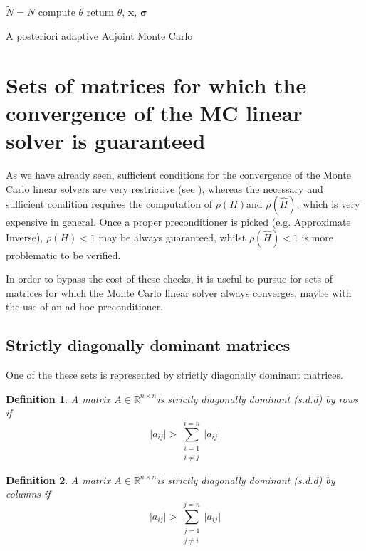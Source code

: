 \documentclass[a4paper,10pt]{article}
\newtheorem{defn}{Definition}
\begin{document}
\begin{algorithm}[H]
 $\tilde{N}=N$\;
 compute $\theta$\;
 return $\theta$, $\mathbf{x}$, $\boldsymbol{\sigma}$\; 
 \caption{A posteriori adaptive Adjoint Monte Carlo}
\end{algorithm}

\section{Sets of matrices for which the convergence of the MC linear solver is 
guaranteed}

As we have already seen, sufficient conditions for 
the convergence of the Monte Carlo linear solvers are very restrictive (see 
\cite{MASC2013}), whereas the necessary and sufficient condition requires the 
computation of 
$\rho(H)$and $\rho(\hat{H})$, which is very expensive in general. Once a 
proper 
preconditioner is picked (e.g. Approximate Inverse), $\rho(H)<1$ may 
be always guaranteed, whilst $\rho(\hat{H})<1$ is more 
problematic to be verified. 

In order to bypass the cost of these checks, it is useful to pursue for sets of 
matrices for 
which the Monte Carlo linear solver always converges, maybe with the use of an 
ad-hoc preconditioner. 

 \subsection{Strictly diagonally dominant matrices}
 One of the these sets is 
represented by strictly diagonally dominant matrices. 

\begin{defn}
 A matrix $A\in\mathbb{R}^{n\times n}$is strictly diagonally dominant (s.d.d) 
by rows if
 \begin{equation}
    \lvert a_{ij}\rvert>\sum_{\substack{i=1\\ i\ne j}}^{i=n}\lvert 
a_{ij}\rvert
\label{sddr}
 \end{equation}
\end{defn}

\begin{defn}
 A matrix $A\in\mathbb{R}^{n\times n}$is strictly diagonally dominant (s.d.d) 
by columns if
 \begin{equation}
    \lvert a_{ij}\rvert>\sum_{\substack{j=1\\ j\ne i}}^{j=n}\lvert 
a_{ij}\rvert
\label{sddc}
 \end{equation}
\end{defn}
 
\end{document}

